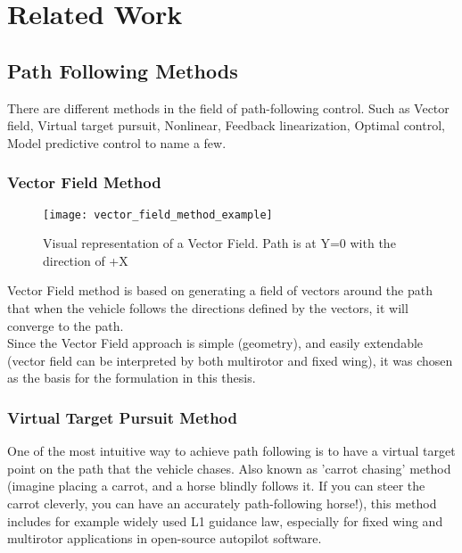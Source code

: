 \chapter{Related Work}
\label{ch:related_work}

\section{Path Following Methods}
\label{sec:path_following_methods}

There are different methods in the field of path-following control. Such as Vector field, Virtual target pursuit, Nonlinear, Feedback linearization, Optimal control, Model predictive control to name a few.

\subsection{Vector Field Method}
\label{subsec:vector_field_method}

\begin{figure}[h] %
    \centering
    \texttt{[image: vector\_field\_method\_example]}
    \caption{Visual representation of a Vector Field. Path is at Y=0 with the direction of +X}
\label{fig:vf_example}
\end{figure}

Vector Field method is based on generating a field of vectors around the path that when the vehicle follows the directions defined by the vectors, it will converge to the path\cite{stastny_flying_2019}\cite{sharma_vector_nodate}.\\

Since the Vector Field approach is simple (geometry), and easily extendable (vector field can be interpreted by both multirotor and fixed wing), it was chosen as the basis for the formulation in this thesis.

\subsection{Virtual Target Pursuit Method}
One of the most intuitive way to achieve path following is to have a virtual target point on the path that the vehicle chases. Also known as 'carrot chasing' method (imagine placing a carrot, and a horse blindly follows it. If you can steer the carrot cleverly, you can have an accurately path-following horse!), this method includes for example widely used L1 guidance law\cite{park_new_2004}, especially for fixed wing and multirotor applications in open-source autopilot software.

